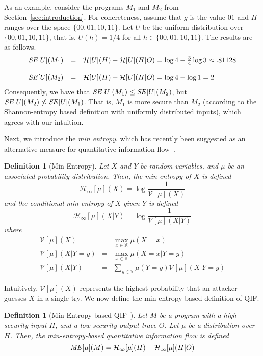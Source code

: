 \documentclass[]{eptcs}
\newcommand{\aset}[1]{\{{#1}\}}
\newtheorem{definition}[theorem]{Definition}
\begin{document}
As an example, consider the programs $M_1$ and $M_2$ from
Section~\ref{sec:introduction}.  For concreteness, assume that $g$ is
the value $01$ and $H$ ranges over the space $\aset{00,01,10,11}$.
Let $U$ be the uniform distribution over $\aset{00,01,10,11}$, that
is, $U(h) = 1/4$ for all $h \in \aset{00,01,10,11}$.  The results are
as follows.
\[
\begin{array}{rcl}
{\it SE}[U](M_1)&=&\mathcal{H}[U](H)-\mathcal{H}[U](H|O)=\log 4-\frac{3}{4}\log{3}\approx .81128\\&&\\

{\it SE}[U](M_2)&=&\mathcal{H}[U](H)-\mathcal{H}[U](H|O)=\log 4-\log 1=2
\end{array}
\]
Consequently, we have that ${\it SE}[U](M_1) \leq {\it SE}[U](M_2)$,
but ${\it SE}[U](M_2) \not\leq {\it SE}[U](M_1)$.  That is, $M_1$ is
more secure than $M_2$ (according to the Shannon-entropy based
definition with uniformly distributed inputs), which agrees with our
intuition.

Next, we introduce the {\em min entropy}, which has recently been
suggested as an alternative measure for quantitative information
flow~\cite{smith09}.
\begin{definition}[Min Entropy]
Let $X$ and $Y$ be random variables, and $\mu$ be an associated probability
distribution.  Then, the min entropy of $X$ is defined
\[
\mathcal{H}_\infty[\mu](X)=\log\frac{1}{\mathcal{V}[\mu](X)}
\]
and the conditional min entropy of $X$ given $Y$ is defined
\[
\mathcal{H}_\infty[\mu](X|Y)=\log\frac{1}{\mathcal{V}[\mu](X|Y)}
\]
where
\[
\begin{array}{rcl}
\mathcal{V}[\mu](X)&=&\max_{x\in\mathbb X} \mu(X=x)\\
\mathcal{V}[\mu](X|Y=y)&=&\max_{x\in\mathbb X} \mu(X=x|Y=y)\\
\mathcal{V}[\mu](X|Y)&=&\sum_{y\in\mathbb Y} \mu(Y=y) \mathcal{V}[\mu](X|Y=y)
\end{array}
\]
\end{definition}

Intuitively, $\mathcal{V}[\mu](X)$ represents the highest probability
that an attacker guesses $X$ in a single try.  We now define the
min-entropy-based definition of QIF.

\begin{definition}[Min-Entropy-based QIF~\cite{smith09}]
\label{def:me}
Let $M$ be a program with a high security input $H$, and a low
security output trace $O$.  Let $\mu$ be a distribution over $H$.
Then, the min-entropy-based quantitative information flow is defined
\[ 
{\it ME}[\mu](M)=\mathcal{H}_\infty[\mu](H)-\mathcal{H}_\infty[\mu](H|O)
\]
\end{definition}
\end{document}
